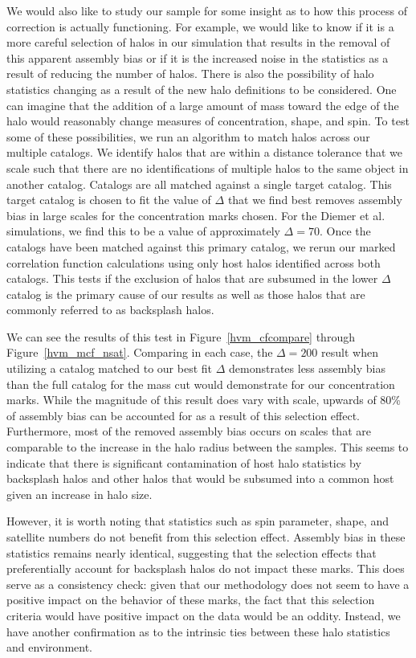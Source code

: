 \documentclass[usenatbib,usegraphicx,letterpaper]{mn2e}
\begin{document}
We would also like to study our sample for some insight as to how this process of correction is actually functioning. For example, we would like to know if it is a more careful selection of halos in our simulation that results in the removal of this apparent assembly bias or if it is the increased noise in the statistics as a result of reducing the number of halos. There is also the possibility of halo statistics changing as a result of the new halo definitions to be considered. One can imagine that the addition of a large amount of mass toward the edge of the halo would reasonably change measures of concentration, shape, and spin. To test some of these possibilities, we run an algorithm to match halos across our multiple catalogs. We identify halos that are within a distance tolerance that we scale such that there are no identifications of multiple halos to the same object in another catalog. Catalogs are all matched against a single target catalog. This target catalog is chosen to fit the value of $\Delta$ that we find best removes assembly bias in large scales for the concentration marks chosen. For the Diemer et al. simulations, we find this to be a value of approximately $\Delta = 70$. Once the catalogs have been matched against this primary catalog, we rerun our marked correlation function calculations using only host halos identified across both catalogs. This tests if the exclusion of halos that are subsumed in the lower $\Delta$ catalog is the primary cause of our results as well as those halos that are commonly referred to as backsplash halos.

We can see the results of this test in Figure~\ref{hvm_cfcompare} through Figure~\ref{hvm_mcf_nsat}. Comparing in each case, the $\Delta = 200$ result when utilizing a catalog matched to our best fit $\Delta$ demonstrates less assembly bias than the full catalog for the mass cut would demonstrate for our concentration marks. While the magnitude of this result does vary with scale, upwards of 80\% of assembly bias can be accounted for as a result of this selection effect. Furthermore, most of the removed assembly bias occurs on scales that are comparable to the increase in the halo radius between the samples. This seems to indicate that there is significant contamination of host halo statistics by backsplash halos and other halos that would be subsumed into a common host given an increase in halo size.

However, it is worth noting that statistics such as spin parameter, shape, and satellite numbers do not benefit from this selection effect. Assembly bias in these statistics remains nearly identical, suggesting that the selection effects that preferentially account for backsplash halos do not impact these marks. This does serve as a consistency check: given that our methodology does not seem to have a positive impact on the behavior of these marks, the fact that this selection criteria would have positive impact on the data would be an oddity. Instead, we have another confirmation as to the intrinsic ties between these halo statistics and environment.
\end{document}
